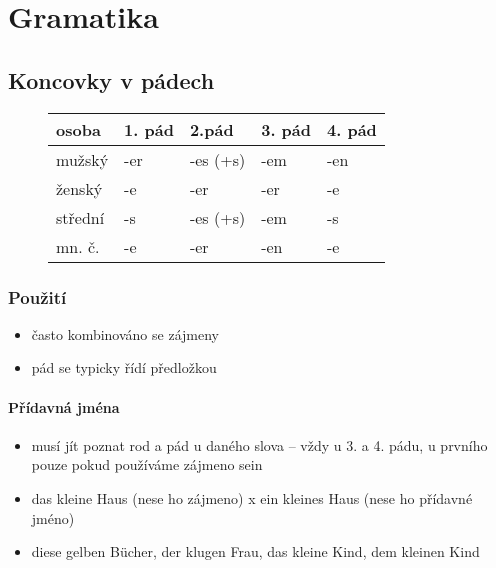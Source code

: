 \documentclass[a4paper,12pt]{report}
\begin{document}
\titlep
\tocp


\chapter{Gramatika}

\section{Koncovky v pádech}

\begin{figure}[h]
  \centering
  \begin{center}
    \begin{longtable}{ | m{2cm} | m{2cm} | m{2cm} | m{2cm} | m{2cm} | }
      \hline
      osoba   & 1. pád & 2.pád    & 3. pád & 4. pád \\
      \hline
      mužský  & -er    & -es (+s) & -em    & -en    \\
      ženský  & -e     & -er      & -er    & -e     \\
      střední & -s     & -es (+s) & -em    & -s     \\
      mn. č.  & -e     & -er      & -en    & -e     \\
      \hline
    \end{longtable}
  \end{center}
\end{figure}

\subsection{Použití}

\begin{itemize}
  \item často kombinováno se zájmeny
  \item pád se typicky řídí předložkou
\end{itemize}

\subsubsection{Přídavná jména}

\begin{itemize}
  \item musí jít poznat rod a pád u daného slova -- vždy u 3. a 4. pádu, u prvního pouze pokud používáme zájmeno sein
  \item das kleine Haus (nese ho zájmeno) x ein kleines Haus (nese ho přídavné jméno)
  \item diese gelben Bücher, der klugen Frau, das kleine Kind, dem kleinen Kind
\end{itemize}
\end{document}
